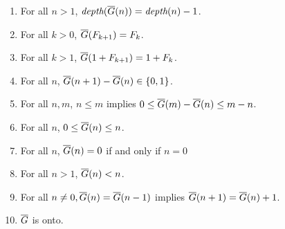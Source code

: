 \documentclass[a4paper,11pt]{article}
\begin{document}
\begin{theorem}\label{FGprops}
\noindent
\begin{enumerate}
\item For all $n>1$, $\textit{depth}(\overline{G}(n)) = \textit{depth}(n)-1$.
\item For all $k>0$, $\overline{G}(F_{k+1}) = F_k$.
\item For all $k>1$, $\overline{G}(1+F_{k+1}) = 1+F_k$.
\item For all $n$, $\overline{G}(n+1)-\overline{G}(n) \in \{0,1\}$.
\item For all $n,m$, $n\le m$ implies $0 \le \overline{G}(m)-\overline{G}(n) \le m-n$.
\item For all $n$, $0 \le \overline{G}(n) \le n$.
\item For all $n$, $\overline{G}(n)=0$ if and only if $n=0$
\item For all $n>1$, $\overline{G}(n)<n$.
\item For all $n\neq 0, \overline{G}(n)=\overline{G}(n-1)$ implies $\overline{G}(n+1)=\overline{G}(n)+1$.
\item $\overline{G}$ is onto.
\end{enumerate}
\end{theorem}
\end{document}
